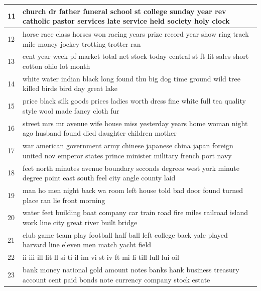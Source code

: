 \documentclass[10pt,journal,compsoc]{IEEEtran}
\begin{document}
\begin{table}
{\begin{tabular}{|p{1cm}|p{16cm}|}
    11       & church dr father funeral school st college sunday year rev catholic pastor services late service held society holy clock                              \\ \hline
    12       & horse race class horses won racing years prize record year show ring track mile money jockey trotting trotter ran                                     \\ \hline
    13       & cent year week pf market total net stock today central st ft lit sales short cotton ohio lot month                                                    \\ \hline
    14       & white water indian black long found thu big dog time ground wild tree killed birds bird day great lake                                                \\ \hline
    15       & price black silk goods prices ladies worth dress fine white full tea quality style wool made fancy cloth fur                                          \\ \hline
    16       & street mrs mr avenue wife house miss yesterday years home woman night ago husband found died daughter children mother                                 \\ \hline
    17       & war american government army chinese japanese china japan foreign united nov emperor states prince minister military french port navy                 \\ \hline
    18       & feet north minutes avenue boundary seconds degrees west york minute degree point east south feel city angle county laid                               \\ \hline
    19       & man ho men night back wa room left house told bad door found turned place ran lie front morning                                                       \\ \hline
    20       & water feet building boat company car train road fire miles railroad island work line city great river built bridge                                    \\ \hline
    21       & club game team play football half ball left college back yale played harvard line eleven men match yacht field                                        \\ \hline
    22       & ii iii ill lit ll si ti il im vi st iv ft mi li till lull lui oil                                                                                     \\ \hline
    23       & bank money national gold amount notes banks hank business treasury account cent paid bonds note currency company stock estate                         \\ \hline

\end{tabular}}
\end{table}
\end{document}
